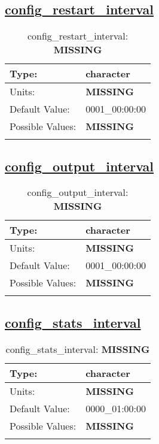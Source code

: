 \subsection[config\_restart\_interval]{\hyperref[sec:nm_tab_io]{config\_restart\_interval}}
\label{subsec:nm_sec_config_restart_interval}
\begin{center}
\begin{longtable}{| p{2.0in} | p{4.0in} |}
    \hline
    Type: & character \\
    \hline
    Units: & {\bf \color{red} MISSING} \\
    \hline
    Default Value: & 0001\_00:00:00 \\
    \hline
    Possible Values: & {\bf \color{red} MISSING} \\
    \hline
    \caption{config\_restart\_interval: {\bf \color{red} MISSING}}
\end{longtable}
\end{center}
\subsection[config\_output\_interval]{\hyperref[sec:nm_tab_io]{config\_output\_interval}}
\label{subsec:nm_sec_config_output_interval}
\begin{center}
\begin{longtable}{| p{2.0in} | p{4.0in} |}
    \hline
    Type: & character \\
    \hline
    Units: & {\bf \color{red} MISSING} \\
    \hline
    Default Value: & 0001\_00:00:00 \\
    \hline
    Possible Values: & {\bf \color{red} MISSING} \\
    \hline
    \caption{config\_output\_interval: {\bf \color{red} MISSING}}
\end{longtable}
\end{center}
\subsection[config\_stats\_interval]{\hyperref[sec:nm_tab_io]{config\_stats\_interval}}
\label{subsec:nm_sec_config_stats_interval}
\begin{center}
\begin{longtable}{| p{2.0in} | p{4.0in} |}
    \hline
    Type: & character \\
    \hline
    Units: & {\bf \color{red} MISSING} \\
    \hline
    Default Value: & 0000\_01:00:00 \\
    \hline
    Possible Values: & {\bf \color{red} MISSING} \\
    \hline
    \caption{config\_stats\_interval: {\bf \color{red} MISSING}}
\end{longtable}
\end{center}
